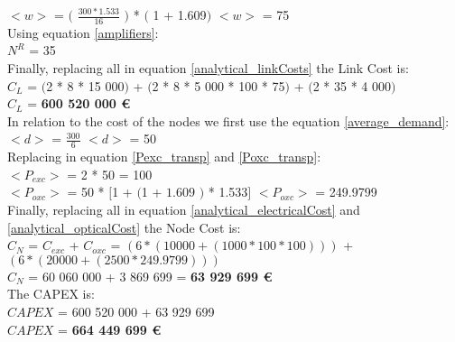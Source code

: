 $<w>$ = $($ $\frac{300 * 1.533}{16}$ $)$ * $($ 1 + 1.609$)$ \qquad \qquad $<w>$ = 75\\

Using equation \ref{amplifiers}:\\

$N^R$ = 35\\

Finally, replacing all in equation \ref{analytical_linkCosts} the Link Cost is:\\

$C_L$ = $($2 * 8 * 15 000$)$ + $($2 * 8 * 5 000 * 100 * 75$)$ + $($2 * 35 * 4 000$)$\\

$C_L$ = \textbf{600 520 000 \euro}\\

In relation to the cost of the nodes we first use the equation \ref{average_demand}:\\

$<d>$ = $\frac{300}{6}$ \qquad \qquad $<d>$ = 50\\

Replacing in equation \ref{Pexc_transp} and \ref{Poxc_transp}:\\

$<P_{exc}>$ = 2 * 50 = 100\\

$<P_{oxc}>$ = 50 * $[$1 + $($1 + $1.609$ $)$ * 1.533$]$ \qquad \quad $<P_{oxc}>$ = 249.9799 \\

Finally, replacing all in equation \ref{analytical_electricalCost} and \ref{analytical_opticalCost} the Node Cost is:\\

$C_N$ = $C_{exc}$ + $C_{oxc}$ = $\left( 6*(10 000 + (1 000 * 100 * 100 ) ) \right)$ + $\left(6*(20 000 + (2 500 * 249.9799) ) \right)$\\

$C_N$ = 60 060 000 + 3 869 699 = \textbf{63 929 699 \euro}\\

The CAPEX is:\\
$CAPEX$ = 600 520 000 + 63 929 699\\

$CAPEX$ = \textbf{664 449 699 \euro}\\

